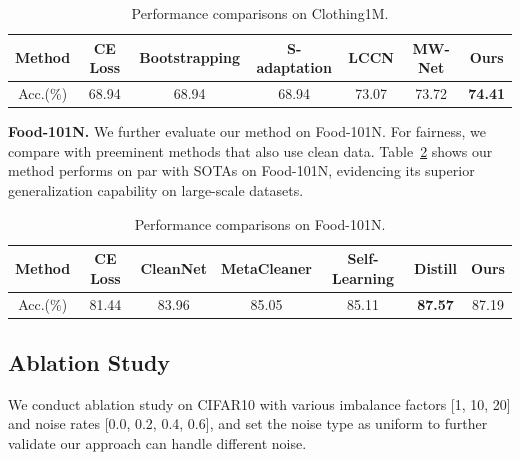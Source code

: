 \documentclass[letterpaper]{article} %
\newcommand{\bd}[1]{\textbf{#1}}
\begin{document}
\begin{table}[h]
  \centering
  \begin{adjustbox}{max width=0.47\textwidth}
    \begin{tabular}{c|cccccc}
    \toprule
    Method & CE Loss & Bootstrapping & S-adaptation & LCCN & MW-Net & Ours \\
    \midrule
    Acc.(\%)  & 68.94 & 68.94 & 68.94 & 73.07 & 73.72 & \bd{74.41} \\
    \bottomrule
    \end{tabular}%
    \end{adjustbox}
    \caption{Performance comparisons on Clothing1M.}
    \label{tab:clothing}
\end{table}%

\noindent\bd{Food-101N.}
We further evaluate our method on Food-101N.
For fairness, we compare with preeminent methods that also use clean data. Table~\ref{tab:food101} shows our method performs on par with SOTAs on Food-101N, evidencing its superior generalization capability on large-scale datasets.
\begin{table}[h]
  \centering
  \begin{adjustbox}{max width=0.47\textwidth}
    \begin{tabular}{c|cccccc}
    \toprule
    Method & CE Loss & CleanNet & MetaCleaner & Self-Learning & Distill & Ours \\
    \midrule
    Acc.(\%)  & 81.44 & 83.96 & 85.05 & 85.11 & \bd{87.57} & 87.19 \\
    \bottomrule
    \end{tabular}%
    \end{adjustbox}
    \caption{Performance comparisons on Food-101N.}
  \label{tab:food101}%
\end{table}%

\subsection{Ablation Study}

We conduct ablation study on CIFAR10 with various imbalance factors [1, 10, 20] and noise rates [0.0, 0.2, 0.4, 0.6], and set the noise type as uniform to further validate our approach can handle different noise.
\end{document}
